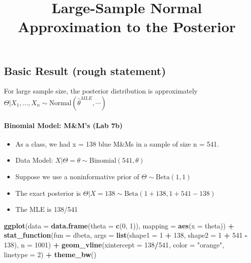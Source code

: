 \documentclass[]{article}
\title{Large-Sample Normal Approximation to the Posterior}
\author{}
\date{}
\newenvironment{Shaded}{\begin{snugshade}}{\end{snugshade}}
\newcommand{\KeywordTok}[1]{\textcolor[rgb]{0.13,0.29,0.53}{\textbf{#1}}}
\newcommand{\DataTypeTok}[1]{\textcolor[rgb]{0.13,0.29,0.53}{#1}}
\newcommand{\DecValTok}[1]{\textcolor[rgb]{0.00,0.00,0.81}{#1}}
\newcommand{\StringTok}[1]{\textcolor[rgb]{0.31,0.60,0.02}{#1}}
\newcommand{\OperatorTok}[1]{\textcolor[rgb]{0.81,0.36,0.00}{\textbf{#1}}}
\newcommand{\NormalTok}[1]{#1}
\providecommand{\tightlist}{%
  \setlength{\itemsep}{0pt}\setlength{\parskip}{0pt}}
\let\oldparagraph\paragraph
\renewcommand{\paragraph}[1]{\oldparagraph{#1}\mbox{}}
\begin{document}
\maketitle

\def\simiid{\stackrel{{\mbox{\text{\tiny i.i.d.}}}}{\sim}}

\subsection{Basic Result (rough
statement)}\label{basic-result-rough-statement}

For large sample size, the posterior distribution is approximately
\(\Theta | X_1, \ldots, X_n \sim \text{Normal}(\hat{\theta}^{MLE}, \cdots)\)

\paragraph{Binomial Model: M\&M's (Lab
7b)}\label{binomial-model-mms-lab-7b}

\begin{itemize}
\tightlist
\item
  As a class, we had x = 138 blue M\&Ms in a sample of size n = 541.
\item
  Data Model: \(X | \Theta = \theta \sim \text{Binomial}(541, \theta)\)
\item
  Suppose we use a noninformative prior of
  \(\Theta \sim \text{Beta}(1, 1)\)
\item
  The exact posterior is
  \(\Theta | X = 138 \sim \text{Beta}(1 + 138, 1 + 541 - 138)\)
\item
  The MLE is 138/541
\end{itemize}

\begin{Shaded}
\begin{Highlighting}[]
\KeywordTok{ggplot}\NormalTok{(}\DataTypeTok{data =} \KeywordTok{data.frame}\NormalTok{(}\DataTypeTok{theta =} \KeywordTok{c}\NormalTok{(}\DecValTok{0}\NormalTok{, }\DecValTok{1}\NormalTok{)), }\DataTypeTok{mapping =} \KeywordTok{aes}\NormalTok{(}\DataTypeTok{x =}\NormalTok{ theta)) }\OperatorTok{+}
\StringTok{  }\KeywordTok{stat_function}\NormalTok{(}\DataTypeTok{fun =}\NormalTok{ dbeta,}
    \DataTypeTok{args =} \KeywordTok{list}\NormalTok{(}\DataTypeTok{shape1 =} \DecValTok{1} \OperatorTok{+}\StringTok{ }\DecValTok{138}\NormalTok{, }\DataTypeTok{shape2 =} \DecValTok{1} \OperatorTok{+}\StringTok{ }\DecValTok{541} \OperatorTok{-}\StringTok{ }\DecValTok{138}\NormalTok{),}
    \DataTypeTok{n =} \DecValTok{1001}\NormalTok{) }\OperatorTok{+}
\StringTok{  }\KeywordTok{geom_vline}\NormalTok{(}\DataTypeTok{xintercept =} \DecValTok{138}\OperatorTok{/}\DecValTok{541}\NormalTok{, }\DataTypeTok{color =} \StringTok{"orange"}\NormalTok{, }\DataTypeTok{linetype =} \DecValTok{2}\NormalTok{) }\OperatorTok{+}
\StringTok{  }\KeywordTok{theme_bw}\NormalTok{()}
\end{Highlighting}
\end{Shaded}
\end{document}
